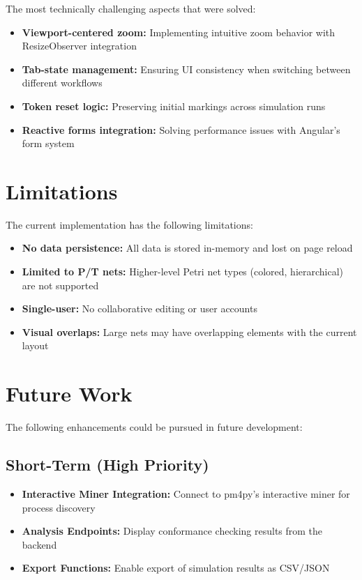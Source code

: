 The most technically challenging aspects that were solved:

\begin{itemize}
    \item \textbf{Viewport-centered zoom:} Implementing intuitive zoom behavior with ResizeObserver integration
    \item \textbf{Tab-state management:} Ensuring UI consistency when switching between different workflows
    \item \textbf{Token reset logic:} Preserving initial markings across simulation runs
    \item \textbf{Reactive forms integration:} Solving performance issues with Angular's form system
\end{itemize}

\section{Limitations}
\label{sec:limitations}

The current implementation has the following limitations:

\begin{itemize}
    \item \textbf{No data persistence:} All data is stored in-memory and lost on page reload
    \item \textbf{Limited to P/T nets:} Higher-level Petri net types (colored, hierarchical) are not supported
    \item \textbf{Single-user:} No collaborative editing or user accounts
    \item \textbf{Visual overlaps:} Large nets may have overlapping elements with the current layout
\end{itemize}

\section{Future Work}
\label{sec:future-work}

The following enhancements could be pursued in future development:

\subsection{Short-Term (High Priority)}

\begin{itemize}
    \item \textbf{Interactive Miner Integration:} Connect to pm4py's interactive miner for process discovery
    \item \textbf{Analysis Endpoints:} Display conformance checking results from the backend
    \item \textbf{Export Functions:} Enable export of simulation results as CSV/JSON
\end{itemize}

